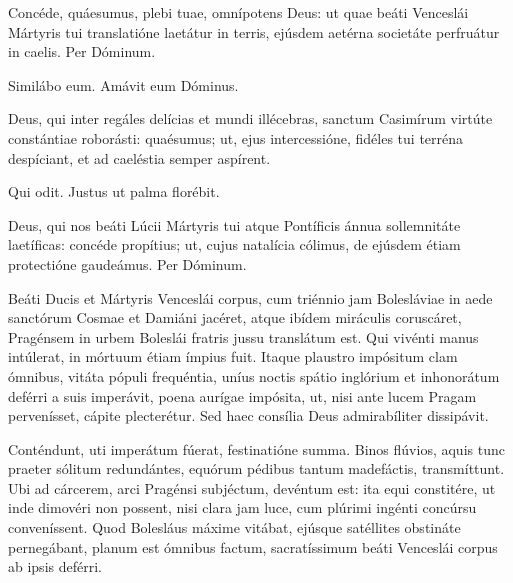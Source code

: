 \begin{caputFesti}
\end{caputFesti}

\parsOratio

Concéde, quáesumus,
plebi tuae, omnípotens Deus:
ut quae beáti Venceslái Mártyris tui translatióne laetátur in terris,
ejúsdem aetérna societáte perfruátur in caelis.
Per Dóminum.

Similábo eum.
Amávit eum Dóminus.

\parsOratio

Deus, qui inter regáles delícias et mundi illécebras,
sanctum Casimírum virtúte constántiae roborásti:
quaésumus;
ut, ejus intercessióne, fidéles tui terréna despíciant,
et ad caeléstia semper aspírent.

Qui odit.
Justus ut palma florébit.

\parsOratio

Deus, qui nos beáti Lúcii Mártyris tui atque Pontíficis
ánnua sollemnitáte laetíficas:
concéde propítius;
ut, cujus natalícia cólimus,
de ejúsdem étiam protectióne gaudeámus.
Per Dóminum.

\horaNocturnusII


Beáti Ducis et Mártyris Venceslái corpus,
cum triénnio jam Bolesláviae in aede sanctórum Cosmae et Damiáni jacéret,
atque ibídem miráculis coruscáret,
Pragénsem in urbem Boleslái fratris jussu translátum est.
Qui vivénti manus intúlerat, in mórtuum étiam ímpius fuit.
Itaque plaustro impósitum clam ómnibus,
vitáta pópuli frequéntia, uníus noctis spátio
inglórium et inhonorátum deférri a suis imperávit,
poena aurígae impósita,
ut, nisi ante lucem Pragam pervenísset, cápite plecterétur.
Sed haec consília Deus admirabíliter dissipávit.



Conténdunt, uti imperátum fúerat, festinatióne summa.
Binos flúvios, aquis tunc praeter sólitum redundántes,
equórum pédibus tantum madefáctis, transmíttunt.
Ubi ad cárcerem, arci Pragénsi subjéctum, devéntum est:
ita equi constitére, ut inde dimovéri non possent,
nisi clara jam luce, cum plúrimi ingénti concúrsu conveníssent.
Quod Bolesláus máxime vitábat, ejúsque satéllites obstináte
pernegábant, planum est ómnibus factum, sacratíssimum beáti
Venceslái corpus ab ipsis deférri.

